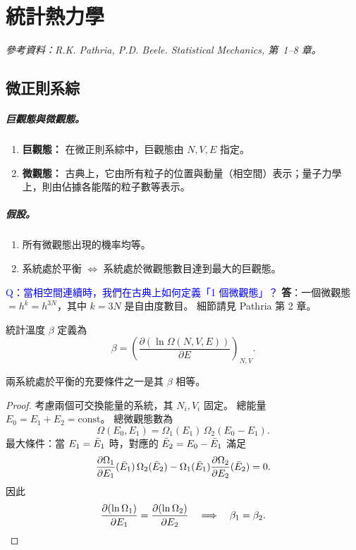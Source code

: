 \chapter{統計熱力學}

\noindent\textit{參考資料：R.K. Pathria, P.D. Beele. \emph{Statistical Mechanics}, 第~1--8 章。}
\section{微正則系綜}
\paragraph{巨觀態與微觀態。}
\begin{enumerate}
    \item \textbf{巨觀態：} 在微正則系綜中，巨觀態由 $N,V,E$ 指定。
    \item \textbf{微觀態：} 古典上，它由所有粒子的位置與動量（相空間）表示；量子力學上，則由佔據各能階的粒子數等表示。
\end{enumerate}

\paragraph{假設。}
\begin{enumerate}[label=(\arabic*)]
    \item 所有微觀態出現的機率均等。
    \item 系統處於平衡 $\iff$ 系統處於微觀態數目達到最大的巨觀態。
\end{enumerate}

\textcolor{blue}{Q：當相空間連續時，我們在古典上如何定義「1 個微觀態」？}
\textbf{答}：一個微觀態 $= h^{k} = h^{3N}$，其中 $k=3N$ 是自由度數目。
細節請見 Pathria 第 2 章。

\begin{definition}[統計溫度]
統計溫度 $\beta$ 定義為
\[
    \beta = \left(\frac{\partial(\ln\Omega(N,V,E))}{\partial E}\right)_{N,V}.
\]
\end{definition}

\begin{theorem}
兩系統處於平衡的充要條件之一是其 $\beta$ 相等。
\end{theorem}

\begin{proof}
考慮兩個可交換能量的系統，其 $N_i,V_i$ 固定。
總能量 $E_0 = E_1+E_2 = \mathrm{const}$。
總微觀態數為
\[
    \Omega(E_0,E_1) = \Omega_1(E_1)\,\Omega_2(E_0-E_1).
\]
最大條件：當 $E_1 = \bar{E}_1$ 時，對應的 $\bar{E}_2 = E_0-\bar{E}_1$ 滿足
\[
    \frac{\partial\Omega_1}{\partial E_1}(\bar{E}_1)\,\Omega_2(\bar{E}_2) - \Omega_1(\bar{E}_1)\frac{\partial\Omega_2}{\partial E_2}(\bar{E}_2) = 0.
\]
因此
\[
    \frac{\partial(\ln\Omega_1)}{\partial E_1} = \frac{\partial(\ln\Omega_2)}{\partial E_2}
    \quad\Longrightarrow\quad \beta_1 = \beta_2. \qedhere
\]
\end{proof}

